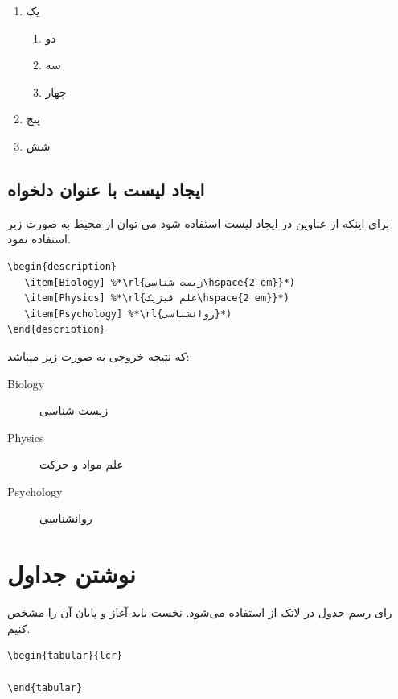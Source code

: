 \begin{enumerate}[label=(\roman*)]
	\item یک 
    \begin{enumerate}[label=(\arabic*)]
    	\item دو
        \item سه
        \item چهار
    \end{enumerate}
    \item پنج
    \item شش
\end{enumerate}

\subsection{ایجاد لیست با عنوان دلخواه } 
برای اینکه از عناوین در ایجاد لیست استفاده شود می توان از محیط 
 به صورت زیر استفاده نمود.
\begin{latin}
\begin{lstlisting}[style=Tex]
\begin{description}
   \item[Biology] %*\rl{زیست شناسی\hspace{2 em}}*) 
   \item[Physics] %*\rl{علم فیزیک\hspace{2 em}}*) 
   \item[Psychology] %*\rl{روانشناسی}*) 
\end{description}
\end{lstlisting}
\end{latin}
که نتیجه خروجی به صورت زیر میباشد:
\begin{description}
\item[Biology]  زیست شناسی
\item[Physics] علم مواد و حرکت
\item[Psychology] روانشناسی
\end{description}
\section{نوشتن جداول}\label{seq:3.4}
رای رسم جدول در لاتک از  استفاده می‌شود. نخست باید آغاز و پایان آن را مشخص کنیم.
\begin{latin}
\begin{lstlisting}[style=Tex]
\begin{tabular}{lcr}

\end{tabular}
\end{lstlisting}
\end{latin}

